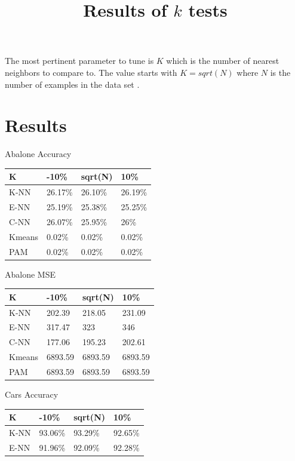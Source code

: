 \documentclass[twoside,11pt]{article}
\begin{document}
The most pertinent parameter to tune is $K$ which is the number of nearest neighbors to compare to. The value starts with $K = sqrt(N)$ where $N$ is the number of examples in the data set \citep{learning-k}.

\section{Results}

\begin{table}[h]
	\title{Results of $k$ tests}
	\begin{minipage}[b]{0.45\linewidth}\centering
		Abalone Accuracy
		\begin{tabular}{llll}
			\hline
			K      & -10\%   & sqrt(N) & 10\%    \\ \hline
			K-NN   & 26.17\% & 26.10\% & 26.19\% \\
			E-NN   & 25.19\% & 25.38\% & 25.25\% \\
			C-NN   & 26.07\% & 25.95\% & 26\%    \\
			Kmeans & 0.02\%  & 0.02\%  & 0.02\%  \\
			PAM    & 0.02\%  & 0.02\%  & 0.02\%
		\end{tabular}
	\end{minipage}
	\hspace{0.5cm}\centering
	\begin{minipage}[b]{0.45\linewidth}
		Abalone MSE
		\centering
		\begin{tabular}{llll}
			\hline
			K      & -10\%   & sqrt(N) & 10\%    \\ \hline
			K-NN   & 202.39  & 218.05  & 231.09  \\
			E-NN   & 317.47  & 323     & 346     \\
			C-NN   & 177.06  & 195.23  & 202.61  \\
			Kmeans & 6893.59 & 6893.59 & 6893.59 \\
			PAM    & 6893.59 & 6893.59 & 6893.59
		\end{tabular}
	\end{minipage}
	\begin{minipage}[b]{0.45\linewidth}\centering
		Cars Accuracy
		\begin{tabular}{llll}
			\hline
			K      & -10\%   & sqrt(N) & 10\%    \\ \hline
			K-NN   & 93.06\% & 93.29\% & 92.65\% \\
			E-NN   & 91.96\% & 92.09\% & 92.28\% \\

\end{tabular}
\end{minipage}
\end{table}
\end{document}
